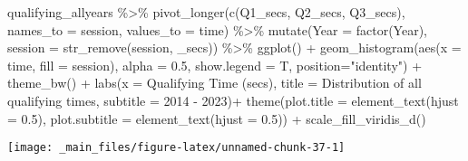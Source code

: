 \documentclass[
]{book}
\newenvironment{Shaded}{\begin{snugshade}}{\end{snugshade}}
\newcommand{\AttributeTok}[1]{\textcolor[rgb]{0.77,0.63,0.00}{#1}}
\newcommand{\FloatTok}[1]{\textcolor[rgb]{0.00,0.00,0.81}{#1}}
\newcommand{\FunctionTok}[1]{\textcolor[rgb]{0.00,0.00,0.00}{#1}}
\newcommand{\NormalTok}[1]{#1}
\newcommand{\SpecialCharTok}[1]{\textcolor[rgb]{0.00,0.00,0.00}{#1}}
\newcommand{\StringTok}[1]{\textcolor[rgb]{0.31,0.60,0.02}{#1}}
\begin{document}
\begin{Shaded}
\begin{Highlighting}[]
\NormalTok{qualifying\_allyears }\SpecialCharTok{\%\textgreater{}\%}
  \FunctionTok{pivot\_longer}\NormalTok{(}\FunctionTok{c}\NormalTok{(}\StringTok{\textquotesingle{}Q1\_secs\textquotesingle{}}\NormalTok{, }\StringTok{\textquotesingle{}Q2\_secs\textquotesingle{}}\NormalTok{, }\StringTok{\textquotesingle{}Q3\_secs\textquotesingle{}}\NormalTok{),}
               \AttributeTok{names\_to =} \StringTok{\textquotesingle{}session\textquotesingle{}}\NormalTok{,}
               \AttributeTok{values\_to =} \StringTok{\textquotesingle{}time\textquotesingle{}}\NormalTok{) }\SpecialCharTok{\%\textgreater{}\%}
  \FunctionTok{mutate}\NormalTok{(}\AttributeTok{Year =} \FunctionTok{factor}\NormalTok{(Year),}
         \AttributeTok{session =} \FunctionTok{str\_remove}\NormalTok{(session, }\StringTok{\textquotesingle{}\_secs\textquotesingle{}}\NormalTok{)) }\SpecialCharTok{\%\textgreater{}\%}
  \FunctionTok{ggplot}\NormalTok{() }\SpecialCharTok{+}
  \FunctionTok{geom\_histogram}\NormalTok{(}\FunctionTok{aes}\NormalTok{(}\AttributeTok{x =}\NormalTok{ time, }\AttributeTok{fill =}\NormalTok{ session),}
                 \AttributeTok{alpha =} \FloatTok{0.5}\NormalTok{, }\AttributeTok{show.legend =}\NormalTok{ T,}
                 \AttributeTok{position=}\StringTok{"identity"}\NormalTok{) }\SpecialCharTok{+}
  \FunctionTok{theme\_bw}\NormalTok{() }\SpecialCharTok{+}
  \FunctionTok{labs}\NormalTok{(}\AttributeTok{x =} \StringTok{\textquotesingle{}Qualifying Time (secs)\textquotesingle{}}\NormalTok{,}
       \AttributeTok{title =} \StringTok{\textquotesingle{}Distribution of all qualifying times\textquotesingle{}}\NormalTok{,}
       \AttributeTok{subtitle =} \StringTok{\textquotesingle{}2014 {-} 2023\textquotesingle{}}\NormalTok{)}\SpecialCharTok{+}
  \FunctionTok{theme}\NormalTok{(}\AttributeTok{plot.title =} \FunctionTok{element\_text}\NormalTok{(}\AttributeTok{hjust =} \FloatTok{0.5}\NormalTok{),}
        \AttributeTok{plot.subtitle =} \FunctionTok{element\_text}\NormalTok{(}\AttributeTok{hjust =} \FloatTok{0.5}\NormalTok{)) }\SpecialCharTok{+}
  \FunctionTok{scale\_fill\_viridis\_d}\NormalTok{()}
\end{Highlighting}
\end{Shaded}

\begin{center}\texttt{[image: \_main\_files/figure-latex/unnamed-chunk-37-1]} \end{center}
\end{document}

